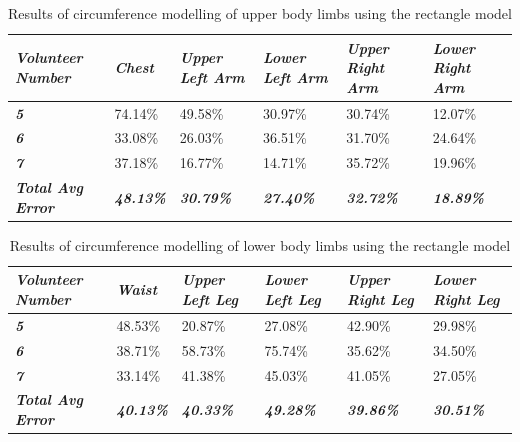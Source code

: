 \begin{table}[htbp]
	\centering
	\caption{Results of circumference modelling of upper body limbs using the rectangle model}
	\begin{tabularx}{\textwidth}{|Y|Y|Y|Y|Y|Y|}
		\toprule
		\textit{\textbf{Volunteer Number}} & \textit{\textbf{Chest}} & \textit{\textbf{Upper Left Arm}} & \textit{\textbf{Lower Left Arm}} & \textit{\textbf{Upper Right Arm}} & \textit{\textbf{Lower Right Arm}} \\
		\midrule
		\textit{\textbf{5}} & 74.14\% & 49.58\% & 30.97\% & 30.74\% & 12.07\% \\
		\midrule
		\textit{\textbf{6}} & 33.08\% & 26.03\% & 36.51\% & 31.70\% & 24.64\% \\
		\midrule
		\textit{\textbf{7}} & 37.18\% & 16.77\% & 14.71\% & 35.72\% & 19.96\% \\
		\midrule
		\textit{\textbf{Total Avg Error}} & \textit{\textbf{48.13\%}} & \textit{\textbf{30.79\%}} & \textit{\textbf{27.40\%}} & \textit{\textbf{32.72\%}} & \textit{\textbf{18.89\%}} \\
		\bottomrule
	\end{tabularx}%
	\label{tab:rectUpper}%
\end{table}%

\begin{table}[htbp]
	\centering
	\caption{Results of circumference modelling of lower body limbs using the rectangle model}
	\begin{tabularx}{\textwidth}{|Y|Y|Y|Y|Y|Y|}
		\toprule
		\textit{\textbf{Volunteer Number}} & \textit{\textbf{Waist}} & \textit{\textbf{Upper Left Leg}} & \textit{\textbf{Lower Left Leg}} & \textit{\textbf{Upper Right Leg}} & \textit{\textbf{Lower Right Leg}} \\
		\midrule
		\textit{\textbf{5}} & 48.53\% & 20.87\% & 27.08\% & 42.90\% & 29.98\% \\
		\midrule
		\textit{\textbf{6}} & 38.71\% & 58.73\% & 75.74\% & 35.62\% & 34.50\% \\
		\midrule
		\textit{\textbf{7}} & 33.14\% & 41.38\% & 45.03\% & 41.05\% & 27.05\% \\
		\midrule
		\textit{\textbf{Total Avg Error}} & \textit{\textbf{40.13\%}} & \textit{\textbf{40.33\%}} & \textit{\textbf{49.28\%}} & \textit{\textbf{39.86\%}} & \textit{\textbf{30.51\%}} \\
		\bottomrule
	\end{tabularx}%
	\label{tab:rectLower}%
\end{table}%

